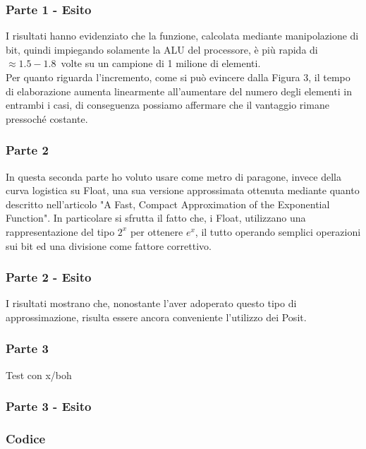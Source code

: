 \documentclass[a4paper,11pt]{article}
\begin{document}
\subsubsection{Parte 1 - Esito}


I risultati hanno evidenziato che la funzione, calcolata mediante manipolazione di bit, quindi impiegando solamente la ALU del processore, è più rapida di $\approx1.5-1.8$\ volte su un campione di 1 milione di elementi. \\
Per quanto riguarda l'incremento, come si può evincere dalla Figura 3, il tempo di elaborazione aumenta linearmente all'aumentare del numero degli elementi in entrambi i casi, di conseguenza possiamo affermare che il vantaggio rimane pressoché costante.

 
\subsubsection{Parte 2}

In questa seconda parte ho voluto usare come metro di paragone, invece della curva logistica su Float, una sua versione approssimata ottenuta mediante quanto descritto nell'articolo "A Fast, Compact Approximation of the Exponential Function"\cite{afast}. In particolare si sfrutta il fatto che, i Float, utilizzano una rappresentazione del tipo $2^x$ per ottenere $e^x$, il tutto operando semplici operazioni sui bit ed una divisione come fattore correttivo. %

\subsubsection{Parte 2 - Esito}


I risultati mostrano che, nonostante l'aver adoperato questo tipo di approssimazione, risulta essere ancora conveniente l'utilizzo dei Posit.

\subsubsection{Parte 3}

Test con x/boh

\subsubsection{Parte 3 - Esito}

\subsubsection{Codice}
\end{document}
